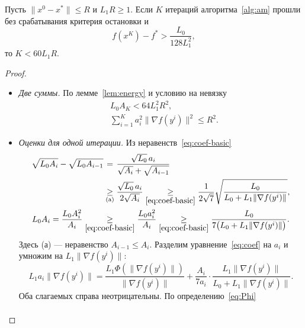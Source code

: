 \documentclass[11pt,a4paper]{article}
\newcommand{\norm}[1]{\|#1\|}
\newcommand{\by}[2]{\mathrel{\underset{#2}{#1}}}
\newcommand{\bypad}[3]{\mathrel{\underset{\mathmakebox[\widthof{$\scriptstyle#3$}]{#2}}{#1}}}
\begin{document}
\begin{lemma}\label{lem:count-anchor}
Пусть $\norm{x^0-x^\ast}\le R$ и $L_1R\ge1$. Если $K$ итераций алгоритма~\ref{alg:am} прошли без срабатывания критерия остановки и
\[
 f(x^K)-f^\ast>\frac{L_0}{128L_1^2},
\]
то $K<60L_1R$.
\end{lemma}

\begin{proof}
\leavevmode
\begin{itemize}
\item \emph{Две суммы.} По лемме~\ref{lem:energy} и условию на невязку
\begin{equation}\label{eq:count-anchor-budget}
\begin{aligned}
 &L_0A_K<64L_1^2R^2,\\
 &\sum_{i=1}^Ka_i^2\norm{\nabla f(y^i)}^2\le R^2 .
\end{aligned}
\end{equation}
\item \emph{Оценки для одной итерации.} Из неравенств~\eqref{eq:coef-basic}
\begin{equation}\label{eq:count-step}
\begin{gathered}
\begin{aligned}
 \sqrt{L_0A_i}-\sqrt{L_0A_{i-1}}
 &\bypad{=}{}{(\mathrm a)}\frac{\sqrt{L_0}\,a_i}{\sqrt{A_i}+\sqrt{A_{i-1}}}\\
 &\by{\ge}{(\mathrm a)}\frac{\sqrt{L_0}\,a_i}{2\sqrt{A_i}}
 \by{\ge}{\eqref{eq:coef-basic}}\frac1{2\sqrt7}\sqrt{\frac{L_0}{L_0+L_1\norm{\nabla f(y^i)}}},
\end{aligned}\\
 L_0A_i=\frac{L_0A_i^2}{A_i}\by{\ge}{\eqref{eq:coef-basic}}\frac{L_0a_i^2}{A_i}\by{\ge}{\eqref{eq:coef-basic}}\frac{L_0}{7\bigl(L_0+L_1\norm{\nabla f(y^i)}\bigr)} .
\end{gathered}
\end{equation}
Здесь (а) --- неравенство $A_{i-1}\le A_i$.
Разделим уравнение~\eqref{eq:coef} на $a_i$ и умножим на $L_1\norm{\nabla f(y^i)}$:
\begin{equation}\label{eq:anchor-identity}
 L_1a_i\norm{\nabla f(y^i)}
 =\frac{L_1\Phi(\norm{\nabla f(y^i)})}{\norm{\nabla f(y^i)}}
 +\frac{A_i}{7a_i}\cdot\frac{L_1\norm{\nabla f(y^i)}}{L_0+L_1\norm{\nabla f(y^i)}} .
\end{equation}
Оба слагаемых справа неотрицательны. По определению~\eqref{eq:Phi}
\begin{equation}\label{eq:Phi-ratio}
\begin{aligned}

\end{aligned}
\end{equation}
\end{itemize}
\end{proof}
\end{document}
